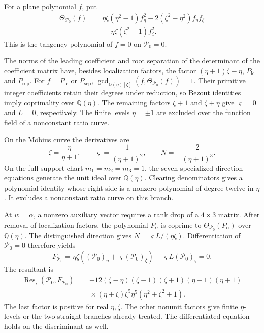 \documentclass[11pt,a4paper]{article}
\numberwithin{equation}{section}
\theoremstyle{plain}
\theoremstyle{definition}
\theoremstyle{remark}
\begin{document}
For a plane polynomial $f$, put
\[
 \begin{aligned}
 \Theta_{\mathcal P_0}(f)={}&\eta\zeta(\eta^2-1)f_\eta^2
                  -2(\zeta^2-\eta^2)f_\eta f_\zeta\\
              &{}-\eta\zeta(\zeta^2-1)f_\zeta^2.
 \end{aligned}
\]
This is the tangency polynomial of $f=0$ on $\mathcal P_0=0$.

The norms of the leading coefficient and root separation of the determinant of the coefficient matrix have, besides localization factors, the factor
$(\eta+1)\zeta-\eta$, $P_{\mathrm{lc}}$ and $P_{\mathrm{sep}}$.
For $f=P_{\mathrm{lc}}$ or $P_{\mathrm{sep}}$,
$\gcd_{\mathbb Q(\eta)[\zeta]}(f,\Theta_{\mathcal P_0}(f))=1$.
Their primitive integer coefficients retain their degrees under
reduction, so Bezout identities imply coprimality over $\mathbb Q(\eta)$.
The remaining factors $\zeta+1$ and $\zeta+\eta$ give
$\varsigma=0$ and $L=0$, respectively.
The finite levels $\eta=\pm1$ are excluded over the function field
of a nonconstant ratio curve.

On the M\"obius curve the derivatives are
\[
 \zeta =\frac{\eta }{\eta +1},\qquad \varsigma =\frac1{(\eta +1)^2},\qquad
 N=-\frac2{(\eta +1)^3}.
\]
On the full support chart $m_1=m_2=m_3=1$, the seven specialized
direction equations generate the unit ideal over
$\mathbb Q(\eta)$. Clearing denominators gives a polynomial identity
whose right side is a nonzero polynomial of degree twelve in $\eta$.
It excludes a nonconstant ratio curve on this branch.

At $w=\alpha$, a nonzero auxiliary vector requires a rank drop of a
$4\times3$ matrix. After removal of localization factors, the polynomial
$P_\alpha$ is coprime to $\Theta_{\mathcal P_0}(P_\alpha)$ over $\mathbb Q(\eta)$.
The distinguished direction gives $N=\varsigma L/(\eta\zeta)$.
Differentiation of $\mathcal P_0=0$ therefore yields
\[
 F_{\mathcal P_0}=\eta \zeta ((\mathcal P_0)_\eta +\varsigma (\mathcal P_0)_\zeta )+\varsigma L(\mathcal P_0)_\varsigma =0.
\]
The resultant is
\[
 \begin{aligned}
 \operatorname{Res}_\varsigma (\mathcal P_0,F_{\mathcal P_0})={}&-12(\zeta -\eta )(\zeta -1)(\zeta +1)(\eta -1)(\eta +1)\\
 &{}\times(\eta +\zeta )\zeta ^5\eta ^5(\eta ^2+\zeta ^2+1).
 \end{aligned}
\]
The last factor is positive for real $\eta,\zeta$.
The other nonunit factors give finite $\eta$-levels or the two straight
branches already treated. The differentiated equation holds on the
discriminant as well.
\end{document}
